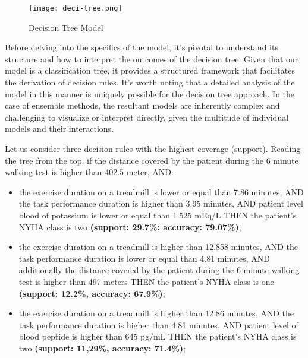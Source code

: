 \begin{figure}[H]
\centering
\texttt{[image: deci-tree.png]}
\caption{Decision Tree Model}
\label{fig:decision tree model}
\end{figure}

Before delving into the specifics of the model, it's pivotal to understand its structure and how to interpret the outcomes of the decision tree. Given that our model is a classification tree, it provides a structured framework that facilitates the derivation of decision rules. 
It's worth noting that a detailed analysis of the model in this manner is uniquely possible for the decision tree approach. In the case of ensemble methods, the resultant models are inherently complex and challenging to visualize or interpret directly, given the multitude of individual models and their interactions.

Let us consider three decision rules with the highest coverage (support). Reading the tree from the top, if the distance covered by the patient during the 6 minute walking test is higher than 402.5 meter, AND: 

\begin{itemize}
    \item the exercise duration on a treadmill is lower or equal than 7.86 minutes, AND 
    the task performance duration is higher than 3.95 minutes, AND patient level blood of potassium is lower or equal than 1.525 mEq/L THEN the patient's NYHA class is two \textbf{(support: 29.7\%; accuracy: 79.07\%)};

    \item the exercise duration on a treadmill is higher than 12.858 minutes, AND the task performance duration is lower or equal than 4.81 minutes, AND additionally the distance covered by the patient during the 6 minute walking test is higher than 497 meters THEN the patient's NYHA class is one \textbf{(support: 12.2\%, accuracy: 67.9\%)};

    \item the exercise duration on a treadmill is higher than 12.86 minutes, AND the task performance duration is higher than 4.81 minutes, AND patient level of blood peptide is higher than 645 pg/mL THEN the patient's NYHA class is two \textbf{(support: 11,29\%, accuracy: 71.4\%)};

  \end{itemize}

